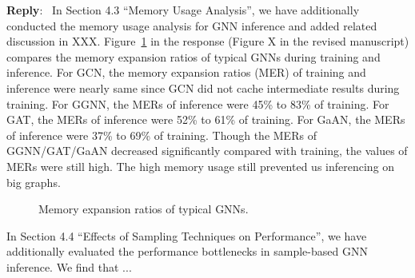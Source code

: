 \documentclass[12pt]{article}
\newenvironment{reply}
   {\medskip \noindent \textbf{Reply}:\  }
   {\medskip}
\begin{document}
\begin{reply}
     In Section 4.3 ``Memory Usage Analysis'', we have additionally conducted the memory usage analysis for GNN inference and added related discussion in XXX.
     Figure~\ref{fig:compare_memory_expasion_ratio} in the response (Figure X in the revised manuscript) compares the memory expansion ratios of typical GNNs during training and inference.
     For GCN, the memory expansion ratios (MER) of training and inference were nearly same since GCN did not cache intermediate results during training.
     For GGNN, the MERs of inference were 45\% to 83\% of training.
     For GAT, the MERs of inference were 52\% to 61\% of training.
     For GaAN, the MERs of inference were 37\% to 69\% of training.
     Though the MERs of GGNN/GAT/GaAN decreased significantly compared with training, the values of MERs were still high.
     The high memory usage still prevented us inferencing on big graphs.
     
     

     
     \begin{figure}[H]
        \caption{Memory expansion ratios of typical GNNs.}
        \label{fig:compare_memory_expasion_ratio}
     \end{figure}
     

     In Section 4.4 ``Effects of Sampling Techniques on Performance'', we have additionally evaluated the performance bottlenecks in sample-based GNN inference.
     We find that ...

\end{reply}
\end{document}
